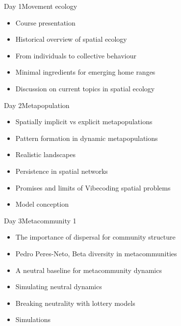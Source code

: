 \documentclass[10pt,aspectratio=149]{beamer}
\begin{document}

\begin{frame}{Day 1}{Movement ecology}

    \begin{itemize}
        \item Course presentation
        \item Historical overview of spatial ecology
        \item From individuals to collective behaviour
        \item Minimal ingredients for emerging home ranges 
        \item Discussion on current topics in spatial ecology
    \end{itemize}

\end{frame}


\begin{frame}{Day 2}{Metapopulation}

    \begin{itemize}
        \item Spatially implicit vs explicit metapopulations
        \item Pattern formation in dynamic metapopulations
        \item Realistic landscapes
        \item Persistence in spatial networks
        \item Promises and limits of Vibecoding spatial problems
        \item Model conception
    \end{itemize}

\end{frame}


\begin{frame}{Day 3}{Metacommunity 1}

    \begin{itemize}
        \item The importance of dispersal for community structure
        \item Pedro Peres-Neto, Beta diversity in metacommunities 
        \item A neutral baseline for metacommunity dynamics
        \item Simulating neutral dynamics
        \item Breaking neutrality with lottery models
        \item Simulations
    \end{itemize}

\end{frame}
\end{document}
